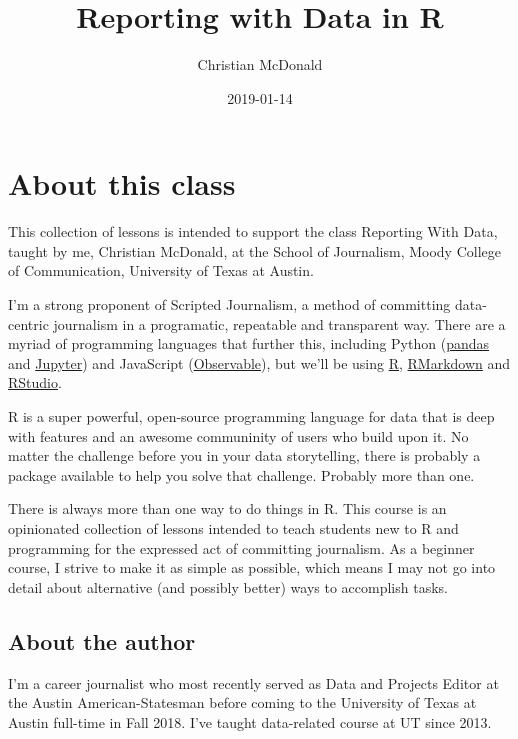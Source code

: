 \documentclass[]{book}
\title{Reporting with Data in R}
\author{Christian McDonald}
\date{2019-01-14}
\begin{document}
\maketitle

{
\setcounter{tocdepth}{1}
\tableofcontents
}
\chapter{About this class}\label{about-this-class}

This collection of lessons is intended to support the class Reporting
With Data, taught by me, Christian McDonald, at the School of
Journalism, Moody College of Communication, University of Texas at
Austin.

I'm a strong proponent of Scripted Journalism, a method of committing
data-centric journalism in a programatic, repeatable and transparent
way. There are a myriad of programming languages that further this,
including Python (\href{https://pandas.pydata.org/}{pandas} and
\href{https://jupyter.org/}{Jupyter}) and JavaScript
(\href{https://beta.observablehq.com/}{Observable}), but we'll be using
\href{https://www.r-project.org/}{R},
\href{https://rmarkdown.rstudio.com/}{RMarkdown} and
\href{https://www.rstudio.com/}{RStudio}.

R is a super powerful, open-source programming language for data that is
deep with features and an awesome communinity of users who build upon
it. No matter the challenge before you in your data storytelling, there
is probably a package available to help you solve that challenge.
Probably more than one.

There is always more than one way to do things in R. This course is an
opinionated collection of lessons intended to teach students new to R
and programming for the expressed act of committing journalism. As a
beginner course, I strive to make it as simple as possible, which means
I may not go into detail about alternative (and possibly better) ways to
accomplish tasks.

\section*{About the author}\label{about-the-author}

I'm a career journalist who most recently served as Data and Projects
Editor at the Austin American-Statesman before coming to the University
of Texas at Austin full-time in Fall 2018. I've taught data-related
course at UT since 2013.
\end{document}

